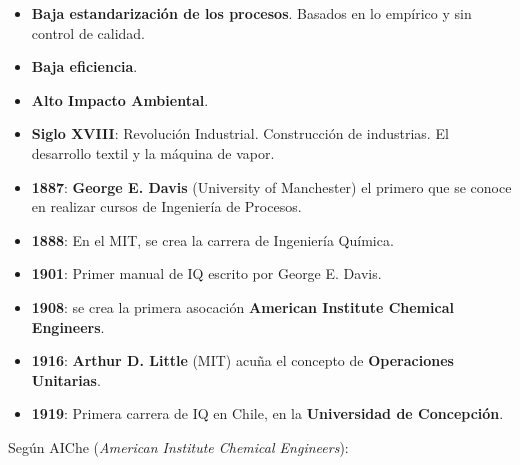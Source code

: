         \begin{itemize}
            \item \textbf{Baja estandarización de los procesos}. Basados en lo empírico y sin control de calidad.
            \item \textbf{Baja eficiencia}.
            \item \textbf{Alto Impacto Ambiental}.
        \end{itemize}
        
            
            \begin{itemize}
                \item \textbf{Siglo XVIII}: Revolución Industrial. Construcción de industrias. El desarrollo textil y la máquina de vapor.
                \item \textbf{1887}: \textbf{George E. Davis} (University of Manchester) el primero que se conoce en realizar cursos de Ingeniería de Procesos.
                \item \textbf{1888}: En el MIT, se crea la carrera de Ingeniería Química.
                \item \textbf{1901}: Primer manual de IQ escrito por George E. Davis.
                \item \textbf{1908}: se crea la primera asocación \textbf{American Institute Chemical Engineers}.
                \item \textbf{1916}: \textbf{Arthur D. Little} (MIT) acuña el concepto de \textbf{Operaciones Unitarias}.
                \item \textbf{1919}: Primera carrera de IQ en Chile, en la \textbf{Universidad de Concepción}.
            \end{itemize}
            
            \newpage
            
            
            Según AIChe (\textit{American Institute Chemical Engineers}):
            
            \begin{quote}
                \textit{}
            \end{quote}
            
